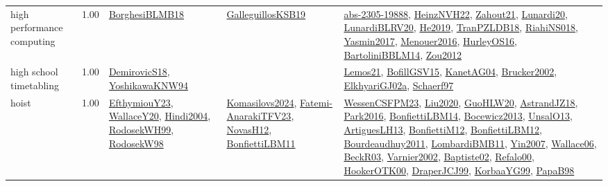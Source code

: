{\begin{longtable}{p{3cm}r>{\raggedright\arraybackslash}p{6cm}>{\raggedright\arraybackslash}p{6cm}>{\raggedright\arraybackslash}p{8cm}}
\index{high performance computing}\index{ApplicationAreas!high performance computing}high performance computing &  1.00 & \hyperref[detail:BorghesiBLMB18]{BorghesiBLMB18} & \hyperref[detail:GalleguillosKSB19]{GalleguillosKSB19} & \hyperref[detail:abs-2305-19888]{abs-2305-19888}, \hyperref[detail:HeinzNVH22]{HeinzNVH22}, \hyperref[detail:Zahout21]{Zahout21}, \hyperref[detail:Lunardi20]{Lunardi20}, \hyperref[detail:LunardiBLRV20]{LunardiBLRV20}, \hyperref[detail:He2019]{He2019}, \hyperref[detail:TranPZLDB18]{TranPZLDB18}, \hyperref[detail:RiahiNS018]{RiahiNS018}, \hyperref[detail:Yasmin2017]{Yasmin2017}, \hyperref[detail:Menouer2016]{Menouer2016}, \hyperref[detail:HurleyOS16]{HurleyOS16}, \hyperref[detail:BartoliniBBLM14]{BartoliniBBLM14}, \hyperref[detail:Zou2012]{Zou2012}\\
\index{high school timetabling}\index{ApplicationAreas!high school timetabling}high school timetabling &  1.00 & \hyperref[detail:DemirovicS18]{DemirovicS18}, \hyperref[detail:YoshikawaKNW94]{YoshikawaKNW94} &  & \hyperref[detail:Lemos21]{Lemos21}, \hyperref[detail:BofillGSV15]{BofillGSV15}, \hyperref[detail:KanetAG04]{KanetAG04}, \hyperref[detail:Brucker2002]{Brucker2002}, \hyperref[detail:ElkhyariGJ02a]{ElkhyariGJ02a}, \hyperref[detail:Schaerf97]{Schaerf97}\\
\index{hoist}\index{ApplicationAreas!hoist}hoist &  1.00 & \hyperref[detail:EfthymiouY23]{EfthymiouY23}, \hyperref[detail:WallaceY20]{WallaceY20}, \hyperref[detail:Hindi2004]{Hindi2004}, \hyperref[detail:RodosekWH99]{RodosekWH99}, \hyperref[detail:RodosekW98]{RodosekW98} & \hyperref[detail:Komasilovs2024]{Komasilovs2024}, \hyperref[detail:Fatemi-AnarakiTFV23]{Fatemi-AnarakiTFV23}, \hyperref[detail:NovasH12]{NovasH12}, \hyperref[detail:BonfiettiLBM11]{BonfiettiLBM11} & \hyperref[detail:WessenCSFPM23]{WessenCSFPM23}, \hyperref[detail:Liu2020]{Liu2020}, \hyperref[detail:GuoHLW20]{GuoHLW20}, \hyperref[detail:AstrandJZ18]{AstrandJZ18}, \hyperref[detail:Park2016]{Park2016}, \hyperref[detail:BonfiettiLBM14]{BonfiettiLBM14}, \hyperref[detail:Bocewicz2013]{Bocewicz2013}, \hyperref[detail:UnsalO13]{UnsalO13}, \hyperref[detail:ArtiguesLH13]{ArtiguesLH13}, \hyperref[detail:BonfiettiM12]{BonfiettiM12}, \hyperref[detail:BonfiettiLBM12]{BonfiettiLBM12}, \hyperref[detail:Bourdeaudhuy2011]{Bourdeaudhuy2011}, \hyperref[detail:LombardiBMB11]{LombardiBMB11}, \hyperref[detail:Yin2007]{Yin2007}, \hyperref[detail:Wallace06]{Wallace06}, \hyperref[detail:BeckR03]{BeckR03}, \hyperref[detail:Varnier2002]{Varnier2002}, \hyperref[detail:Baptiste02]{Baptiste02}, \hyperref[detail:Refalo00]{Refalo00}, \hyperref[detail:HookerOTK00]{HookerOTK00}, \hyperref[detail:DraperJCJ99]{DraperJCJ99}, \hyperref[detail:KorbaaYG99]{KorbaaYG99}, \hyperref[detail:PapaB98]{PapaB98}\\

\end{longtable}}
